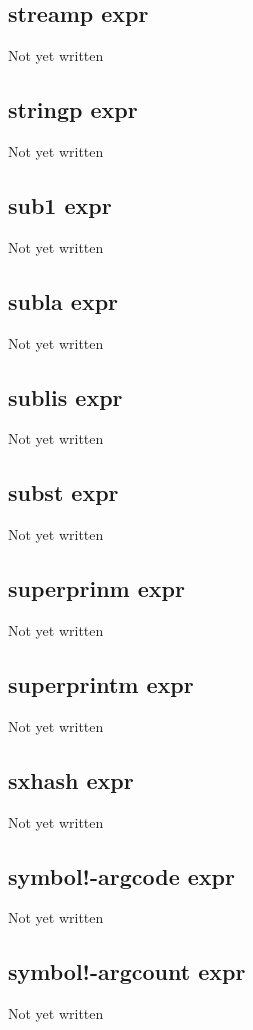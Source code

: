 \documentclass[a4paper,11pt]{article}
\begin{document}
{\subsection{\ttfamily streamp expr}
   Not yet written

\subsection{\ttfamily stringp expr}
   Not yet written

\subsection{\ttfamily sub1 expr}
   Not yet written

\subsection{\ttfamily subla expr}
   Not yet written

\subsection{\ttfamily sublis expr}
   Not yet written

\subsection{\ttfamily subst expr}
   Not yet written

\subsection{\ttfamily superprinm expr}
   Not yet written

\subsection{\ttfamily superprintm expr}
   Not yet written

\subsection{\ttfamily sxhash expr}
   Not yet written

\subsection{\ttfamily symbol!-argcode expr}
   Not yet written

\subsection{\ttfamily symbol!-argcount expr}
   Not yet written

}
\end{document}
